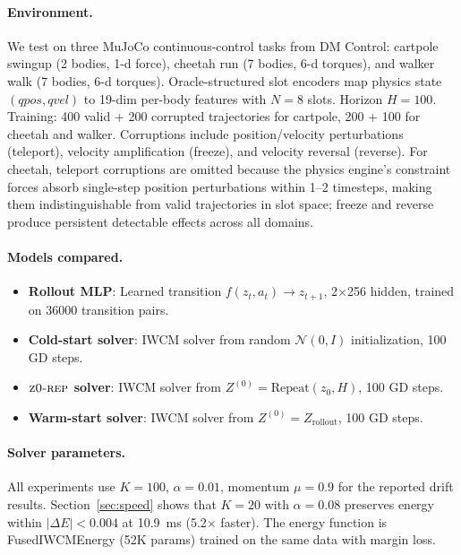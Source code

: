 \documentclass[12pt]{article}
\newcommand{\zrep}{\textsc{z0-rep}}
\begin{document}
\paragraph{Environment.} We test on three MuJoCo continuous-control tasks from DM Control: cartpole swingup (2 bodies, 1-d force), cheetah run (7 bodies, 6-d torques), and walker walk (7 bodies, 6-d torques). Oracle-structured slot encoders map physics state $(qpos, qvel)$ to 19-dim per-body features with $N=8$ slots. Horizon $H=100$. Training: 400 valid + 200 corrupted trajectories for cartpole, 200 + 100 for cheetah and walker. Corruptions include position/velocity perturbations (teleport), velocity amplification (freeze), and velocity reversal (reverse). For cheetah, teleport corruptions are omitted because the physics engine's constraint forces absorb single-step position perturbations within 1--2 timesteps, making them indistinguishable from valid trajectories in slot space; freeze and reverse produce persistent detectable effects across all domains.

\paragraph{Models compared.}

\begin{itemize}
  \item \textbf{Rollout MLP}: Learned transition $f(z_t, a_t) \to z_{t+1}$, 2$\times$256 hidden, trained on 36000 transition pairs.
  \item \textbf{Cold-start solver}: IWCM solver from random $\mathcal{N}(0,I)$ initialization, 100 GD steps.
  \item \textbf{$\zrep$ solver}: IWCM solver from $Z^{(0)} = \text{Repeat}(z_0, H)$, 100 GD steps.
  \item \textbf{Warm-start solver}: IWCM solver from $Z^{(0)} = Z_\text{rollout}$, 100 GD steps.
\end{itemize}

\paragraph{Solver parameters.} All experiments use $K=100$, $\alpha=0.01$, momentum $\mu=0.9$ for the reported drift results. Section~\ref{sec:speed} shows that $K=20$ with $\alpha=0.08$ preserves energy within $|\Delta E| < 0.004$ at 10.9~ms (5.2$\times$ faster). The energy function is FusedIWCMEnergy (52K params) trained on the same data with margin loss.
\end{document}
